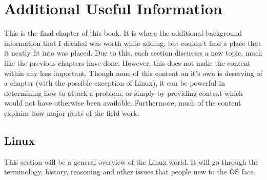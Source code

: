 \chapter{Additional Useful Information}
	\label{ch:GeneralKnowledge}
	This is the final chapter of this book.
	It is where the additional background information that I decided was worth while adding, but couldn't find a place that it neatly fit into was placed.
	Due to this, each section discusses a new topic, much like the previous chapters have done.
	However, this does not make the content within any less important.
	Though none of this content on it's own is deserving of a chapter (with the possible exception of Linux),
	it can be powerful in determining how to attack a problem, or simply by providing context which would not have otherwise been available.
	Furthermore, much of the content explains how major parts of the field work.
	\section{Linux}
		This section will be a general overview of the Linux world.
		It will go through the terminology, history, reasoning and other issues that people new to the OS face\cite{LinuxIntro}.
